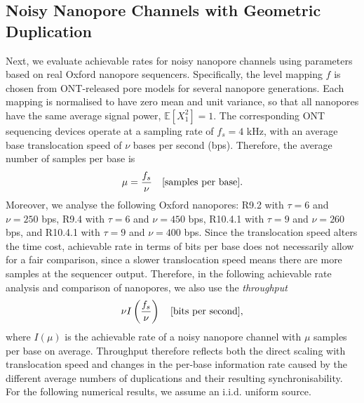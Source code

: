 \documentclass[onecolumn]{IEEEtran}
\theoremstyle{definition}
\begin{document}
\subsection{Noisy Nanopore Channels with Geometric Duplication}
Next, we evaluate achievable rates for noisy nanopore channels using parameters based on real Oxford nanopore sequencers. Specifically, the level mapping $f$ is chosen from ONT-released pore models for several nanopore generations. Each mapping is normalised to have zero mean and unit variance, so that all nanopores have the same average signal power, $\mathbb{E}[X^2_1]=1$. The corresponding ONT sequencing devices operate at a sampling rate of $f_s=4$ kHz, with an average base translocation speed of $\nu$ bases per second (bps). Therefore, the average number of samples per base is 
\begin{align}
    \mu = \frac{f_s}{\nu} \quad \text{[samples per base]}.\notag
\end{align}
Moreover, we analyse the following Oxford nanopores: R9.2 with $\tau=6$ and $\nu=250$ bps, R9.4 with $\tau=6$ and $\nu =450$ bps, R10.4.1 with $\tau=9$ and $\nu=260$ bps, and R10.4.1 with $\tau=9$ and $\nu=400$ bps. Since the translocation speed alters the time cost, achievable rate  in terms of bits per base does not necessarily allow for a fair comparison, since a slower translocation speed means there are more samples at the sequencer output. Therefore, in the following achievable rate analysis and comparison of nanopores, we also use the {\em throughput}
\begin{align}
        \nu I\left(\frac{f_s}{\nu}\right) \quad \text{[bits per second]},\notag
\end{align}
where $I(\mu)$ is the achievable rate of a noisy nanopore channel with $\mu$ samples per base on average. {Throughput therefore reflects both the direct scaling with translocation speed
and changes in the per-base information rate caused by the different average
numbers of duplications and their resulting synchronisability.} For the following numerical results, we assume an i.i.d. uniform source. 
\end{document}
